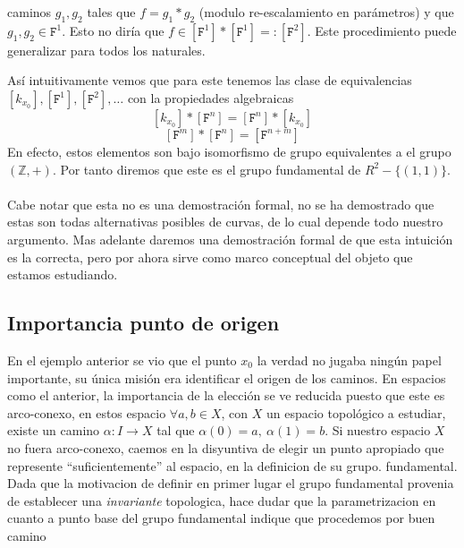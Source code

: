 {\begin{itemize}
  caminos \(g_1, g_2\) tales que \(f = g_1 * g_2\) (modulo re-escalamiento
  en parámetros) y que \(g_1, g_2 \in \mathtt F ^1\). Esto no diría que
  \( f \in [\mathtt F ^1] * [\mathtt F ^1] =: [\mathtt F ^2]\). Este
  procedimiento puede generalizar para todos los naturales.
\end{itemize}
Así intuitivamente vemos que para este tenemos las clase de
equivalencias \([k_{x_0}], [\mathtt F ^1], [\mathtt F ^2], \dots \) con
la propiedades algebraicas
\[ [k_{x_0}] * [\mathtt F ^n] = [\mathtt F ^n] * [k_{x_0}]\]
\[ [\mathtt F ^m]  * [\mathtt F ^n] = [\mathtt F ^{n + m}]\]
En efecto, estos elementos son bajo isomorfismo de grupo equivalentes a
el grupo \((\mathbb{Z}, +)\). Por tanto diremos que este es el grupo
fundamental de \(R^2 - \{(1,1)\}\).

\paragraph{} Cabe notar que esta no es una demostración formal, no se ha demostrado
que estas son todas alternativas posibles de curvas, de lo cual depende
todo nuestro argumento. Mas adelante daremos una demostración formal de
que esta intuición es la correcta, pero por ahora sirve como marco
conceptual del objeto que estamos estudiando.

\subsection{Importancia punto de origen}
En el ejemplo anterior se vio que el punto \(x_0\) la verdad no
jugaba ningún papel importante, su única misión era identificar el
origen de los caminos. En espacios como el anterior, la importancia de
la elección se ve reducida puesto que este es arco-conexo, en estos
espacio \(\forall a,b \in X\), con \(X\) un espacio topológico a
estudiar, existe un camino \(\alpha : I \to X\) tal que \(\alpha (0) =
a,\ \alpha (1) = b\). Si nuestro espacio \(X\) no fuera arco-conexo,
caemos en la disyuntiva de elegir un punto apropiado que represente
``suficientemente'' al espacio, en la definicion de su grupo.
fundamental. Dada que la motivacion de definir en primer lugar el grupo
fundamental provenia de establecer una \emph{invariante} topologica,
hace dudar que la parametrizacion en cuanto a punto base del grupo
fundamental indique que procedemos por buen camino

}
